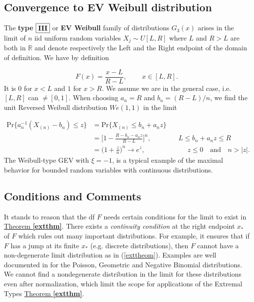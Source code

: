 \subsection*{Convergence to EV Weibull distribution}

The \textbf{type}  $\boxed{\textbf{\text{III}}}$ or \textbf{EV Weibull} family of distributions $G_3(x)$ arises in the limit of $n$ iid uniform random variables $X_j\sim U[L,R]$ where $L$ and $R>L$ are both in $\mathbb{R}$  and denote respectively the Left and the Right endpoint of the domain of definition. We have by definition

\begin{equation*}
F(x)=\frac{x-L}{R-L}, \ \ \ \ \ \ \ \  \ \ x\in [L,R].
\end{equation*}
It is $0$ for $x<L$ and $1$ for $x>R$.
We assume we are in the general case, i.e. $[L,R]$ can $\neq [0,1]$. When choosing $a_n=R$ and $b_n=(R-L)/n$, we find the unit Reversed Weibull distribution $We(1,1)$ in the limit 

\begin{equation*}
\begin{aligned}
\text{Pr}\{a_n^{-1}(X_{(n)}-b_n)\leq z\}
&=\text{Pr}\{X_{(n)}\leq b_n+a_nz\} \\
& = \bigg[1-\frac{R-b_n-a_nz}{R-L}\bigg]^n, \qquad\qquad L\leq b_n+a_nz\leq R \\ 
& = \Big(1+\frac{z}{n}\Big)^n\to e^z, \ \qquad \qquad\qquad  z\leq 0 \quad \text{and} \quad n>|z|.
\end{aligned}
\end{equation*}
 The Weibull-type GEV with $\xi=-1$, is a typical example of the maximal behavior for bounded random variables with
continuous distributions.


\subsection*{Conditions and Comments}

It stands to reason that the df $F$ needs certain conditions for the limit to exist in \hyperref[extthm]{Theorem \textbf{\ref{extthm}}}. There exists a \emph{continuity condition} at the right endpoint $x_*$ of $F$ which rules out many important distributions. For example, it ensures that if $F$ has a jump at its finite $x_*$ (e.g. discrete distributions), then $F$ cannot have a non-degenerate limit distribution as in (\ref{exttheom}). Examples are well documented in \citet[section 3.1]{embrechts_modelling_2011} for the Poisson, Geometric and Negative Binomial distributions. We cannot find a nondegenerate distribution in the limit for these distributions even after normalization, which limit the scope for applications of the Extremal Types \hyperref[extthm]{Theorem \textbf{\ref{extthm}}}. 

